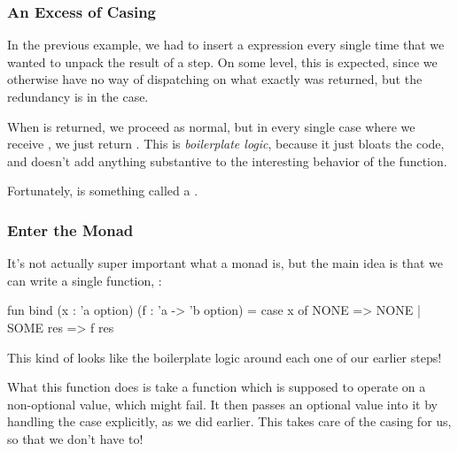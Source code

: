 \documentclass[aspectratio=169]{beamer}
\begin{document}
\begin{frame}[fragile]
  \frametitle{An Excess of Casing}

  In the previous example, we had to insert a  expression every single 
  time that we wanted to unpack the result of a step. On some level, this is expected,
  since we otherwise have no way of dispatching on what exactly was returned, but the
  redundancy is in the  case.

  \pause
  \vspace{\fill}

  When  is returned, we proceed as normal, but in every single case where we
  receive , we just return . This is \textit{boilerplate logic},
  because it just bloats the code, and doesn't add anything substantive to the interesting
  behavior of the function.

  \pause
  \vspace{\fill}

  Fortunately,  is something called a .

  \pause
  \vspace{\fill}

\end{frame}

\begin{frame}[fragile]
  \frametitle{Enter the Monad}

  \tgs

  It's not actually super important what a monad is, but the main idea is that we can
  write a single function, :

  \pause
  \begin{codeblock}
    fun bind (x : 'a option) (f : 'a -> 'b option) = 
      case x of
        NONE => NONE
      | SOME res => f res
  \end{codeblock}

  \pause
  \vspace{\fill}

  This kind of looks like the boilerplate logic around each one of our earlier steps!

  \pause
  \vspace{\fill}

  What this function does is take a function which is supposed to operate on a non-optional
  value, which might fail. It then passes an optional value into it by handling the 
   case explicitly, as we did earlier. This takes care of the casing for us,
  so that we don't have to!
\end{frame}
\end{document}
